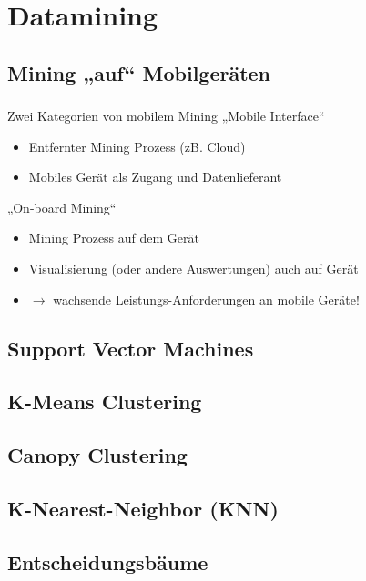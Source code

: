 \section{Datamining}

\subsection{Mining „auf“ Mobilgeräten}

\begin{frame}
    \frametitle{\insertsubsection}
    \begin{block}{Zwei Kategorien von mobilem Mining \cite{pocket2014}}
        \vspace{1em}
        „Mobile Interface“
        \vspace{0.6em}
        \begin{itemize}
            \setlength\itemsep{0.6em}
            \item Entfernter Mining Prozess (zB. Cloud)
            \item Mobiles Gerät als Zugang und Datenlieferant
        \end{itemize}
        \vspace{0.8em}
        „On-board Mining“
        \vspace{0.6em}
        \begin{itemize}
            \setlength\itemsep{0.6em}
            \item Mining Prozess auf dem Gerät
            \item Visualisierung (oder andere Auswertungen) auch auf Gerät
            \item $\rightarrow$ wachsende Leistungs-Anforderungen an mobile Geräte!
        \end{itemize}
    \end{block}
\end{frame}

\subsection{Support Vector Machines}

\subsection{K-Means Clustering}

\subsection{Canopy Clustering}

\subsection{K-Nearest-Neighbor (KNN)}

\subsection{Entscheidungsbäume}